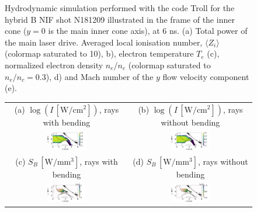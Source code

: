 \documentclass[%
 reprint,
 amsmath,amssymb,
 aps,
]{revtex4-1}
\begin{document}
\begin{figure}
\begin{tabular}{ccc}
\end{tabular}
\caption{ \label{fig:icf} 
Hydrodynamic simulation performed with the code Troll \cite[]{Lefebvre_2018} for the  hybrid B NIF shot N181209 \cite[]{POP_Kritcher_2020,POP_Zylstra_2020,POP_Hohenberger_2020} 
illustrated in the frame of the inner cone ($y=0$ is the main inner cone axis), at 6 ns. 
(a) Total power of the main laser drive.
 Averaged local ionisation number, $\langle Z_i\rangle$ (colormap saturated to 10), b), electron temperature $ T_e$  (c), normalized electron density $n_e/n_c$ (colormap saturated to $n_e/n_c=0.3$), d) and Mach number of the $y$ flow velocity component (e).
}
\end{figure}
\begin{figure}
\begin{tabular}{cc}
(a) $\log(I\, [\mathrm{W/cm^2}])$, rays with bending &(b)  $\log(I\, [\mathrm{W/cm^2}])$, rays without bending\\
\includegraphics[width=0.33\textwidth]{bb_Fig5a.png} 
&\includegraphics[width=0.33\textwidth]{bb_Fig5b.png} \\
(c) $S_{B}\, [\mathrm{W/mm^3}]$, rays with bending &(d)  $S_{B}\, [\mathrm{W/mm^3}]$, rays without bending\\
\includegraphics[width=0.33\textwidth]{bb_Fig5c.png} 
&\includegraphics[width=0.33\textwidth]{Set6ns_withoutbb.png}\\

\end{tabular}
\end{figure}
\end{document}

